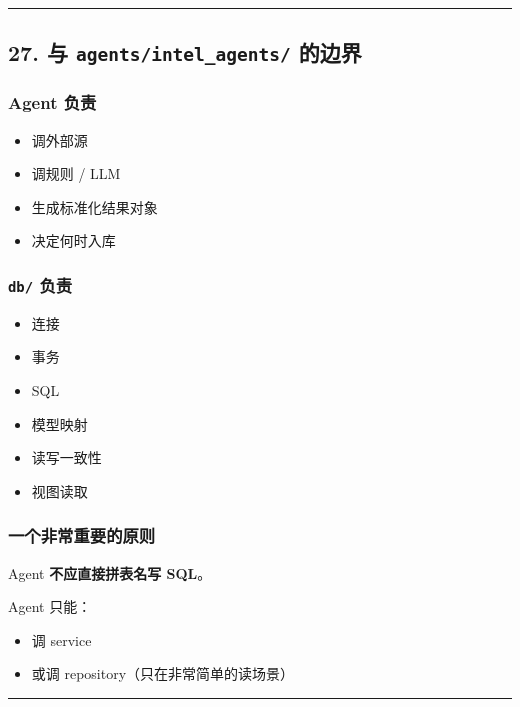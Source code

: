 \documentclass[UTF8]{ctexart}
\providecommand{\tightlist}{%
  \setlength{\itemsep}{0pt}\setlength{\parskip}{0pt}}
\begin{document}
\begin{center}\rule{0.5\linewidth}{0.5pt}\end{center}

\hypertarget{ux4e0e-agentsintel_agents-ux7684ux8fb9ux754c}{%
\subsection{\texorpdfstring{27. 与 \texttt{agents/intel\_agents/}
的边界}{27. 与 agents/intel\_agents/ 的边界}}\label{ux4e0e-agentsintel_agents-ux7684ux8fb9ux754c}}

\hypertarget{agent-ux8d1fux8d23}{%
\subsubsection{Agent 负责}\label{agent-ux8d1fux8d23}}

\begin{itemize}
\tightlist
\item
  调外部源
\item
  调规则 / LLM
\item
  生成标准化结果对象
\item
  决定何时入库
\end{itemize}

\hypertarget{db-ux8d1fux8d23}{%
\subsubsection{\texorpdfstring{\texttt{db/}
负责}{db/ 负责}}\label{db-ux8d1fux8d23}}

\begin{itemize}
\tightlist
\item
  连接
\item
  事务
\item
  SQL
\item
  模型映射
\item
  读写一致性
\item
  视图读取
\end{itemize}

\hypertarget{ux4e00ux4e2aux975eux5e38ux91cdux8981ux7684ux539fux5219}{%
\subsubsection{一个非常重要的原则}\label{ux4e00ux4e2aux975eux5e38ux91cdux8981ux7684ux539fux5219}}

Agent \textbf{不应直接拼表名写 SQL}。

Agent 只能：

\begin{itemize}
\tightlist
\item
  调 service
\item
  或调 repository（只在非常简单的读场景）
\end{itemize}

\begin{center}\rule{0.5\linewidth}{0.5pt}\end{center}
\end{document}
